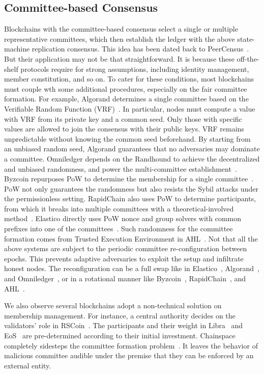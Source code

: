 \subsection{Committee-based Consensus}
Blockchains with the committee-based consensus select a single or multiple representative committees, which then establish the ledger with the above state-machine replication consensus. 
This idea has been dated back to PeerCensus~\cite{decker2016bitcoin}. 
But their application may not be that straightforward. 
It is because these off-the-shelf protocols require for strong assumptions, including identity management, member constitution, and so on. 
To cater for these conditions, most blockchains must couple wth some additional procedures, especially on the fair committee formation. 
For example, Algorand determines a single committee based on the Verifiable Random Function (VRF)~\cite{gilad2017algorand}. 
In particular, nodes must compute a value with VRF from its private key and a common seed. 
Only those with specific values are allowed to join the consensus with their public keys. 
VRF remains unpredictable without knowing the common seed beforehand. 
By starting from an unbiased random seed, Algorand guarantees that no adversaries may dominate a committee. 
Omniledger depends on the Randhound to achieve the decentralized and unbiased randomness, and power the multi-committee establishment~\cite{kokoris2018omniledger}. 
Byzcoin repurposes PoW to determine the membership for a single committee~\cite{kogias2016enhancing}. 
PoW not only guarantees the randomness but also resists the Sybil attacks under the permissionless setting. 
RapidChain also uses PoW to determine participants, from which it breaks into multiple committees with a theoretical-involved method~\cite{zamani2018rapidchain}. 
Elastico directly uses PoW nonce and group solvers with common prefixes into one of the committees~\cite{luu2016secure}. 
Such randomness for the committee formation comes from Trusted Execution Environment in AHL~\cite{dang2019towards}.
Not that all the above systems are subject to the periodic committee re-configuration between epochs. 
This prevents adaptive adversaries to exploit the setup and infiltrate honest nodes. 
The reconfiguration can be a full swap like in Elastico~\cite{luu2016secure}, Algorand~\cite{gilad2017algorand}, and Omniledger~\cite{kokoris2018omniledger}, or in a rotational manner like Byzcoin~\cite{kogias2016enhancing}, RapidChain~\cite{zamani2018rapidchain}, and AHL~\cite{dang2019towards}. 

We also observe several blockchains adopt a non-technical solution on membership management. 
For instance, a central authority decides on the validators' role in RSCoin~\cite{danezis2015centrally}. 
The participants and their weight in Libra~\cite{baudet2019state} and EoS~\cite{xu2018eos} are pre-determined according to their initial investment. 
Chainspace completely sidesteps the committee formation problem~\cite{al2017chainspace}. 
It leaves the behavior of malicious committee audible under the premise that they can be enforced by an external entity.

